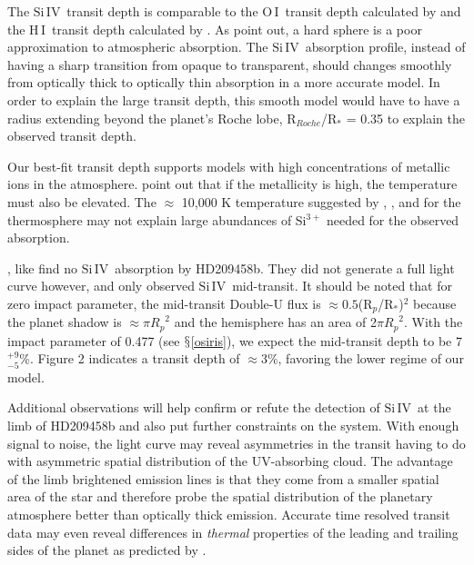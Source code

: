 \documentclass[manuscript]{aastex}
\newcommand{\oi}{\ensuremath{\mathrm{O}\,\scriptstyle \mathrm{I}}}
\newcommand{\hi}{\ensuremath{\mathrm{H}\,\scriptstyle \mathrm{I}}}
\newcommand{\siIV}{\ensuremath{\mathrm{Si}\,\scriptstyle \mathrm{IV}}}
\newcommand{\p}{R$_p$/R$_*$}
\newcommand{\lya}{Lyman-$\alpha$}
\begin{document}
The \siIV\ transit depth is comparable to the \oi\ transit depth calculated by \citet{vidmad} and the \hi\ transit depth calculated by \citet{benjaf7}. As \citet{kosk} point out, a hard sphere is a poor approximation to atmospheric absorption. The \siIV\ absorption profile, instead of having a sharp transition from opaque to transparent, should changes smoothly from optically thick to optically thin absorption in a more accurate model. In order to explain the large transit depth, this smooth model would have to have a radius extending beyond the planet's Roche lobe, R$_{Roche}$/R$_*$ = 0.35 \citep{ben10} to explain the observed transit depth.

Our best-fit transit depth supports models with high concentrations of metallic ions in the atmosphere. \citet{kosk} point out that if the metallicity is high, the temperature must also be elevated. The $\approx$ 10,000 K temperature suggested by \citet{gmunoz}, \citet{mclay}, and \citet{kosk} for the thermosphere may not explain large abundances of Si$^{3+}$ needed for the observed absorption. 


\citet{linsky}, like \citet{vidmad} find no \siIV\ absorption by HD209458b. They did not generate a full light curve however, and only observed \siIV\ mid-transit. It should be noted that for zero impact parameter, the mid-transit Double-U flux is $\approx 0.5 $(\p)$^2$ because the planet shadow is $\approx \pi {R_p}^2$ and the hemisphere has an area of 2$\pi {R_p}^2$. With the impact parameter of 0.477 (see $\mathsection$\ref{osiris}), we expect the mid-transit depth to be  7$^{+9}_{-5}$\%. \citet{linsky} Figure 2 indicates a transit depth of $\approx 3$\%, favoring the lower regime of our model.

Additional observations will help confirm or refute the detection of \siIV\ at the limb of HD209458b and also put further constraints on the system. With enough signal to noise, the light curve may reveal asymmetries in the transit having to do with asymmetric spatial distribution of the UV-absorbing cloud. The advantage of the limb brightened emission lines is that they come from a smaller spatial area of the star and therefore probe the spatial distribution of the planetary atmosphere better than optically thick emission. Accurate time resolved transit data may even reveal differences in {\it thermal} properties of the leading and trailing sides of the planet as predicted by \citet{fortney}.
\end{document}

